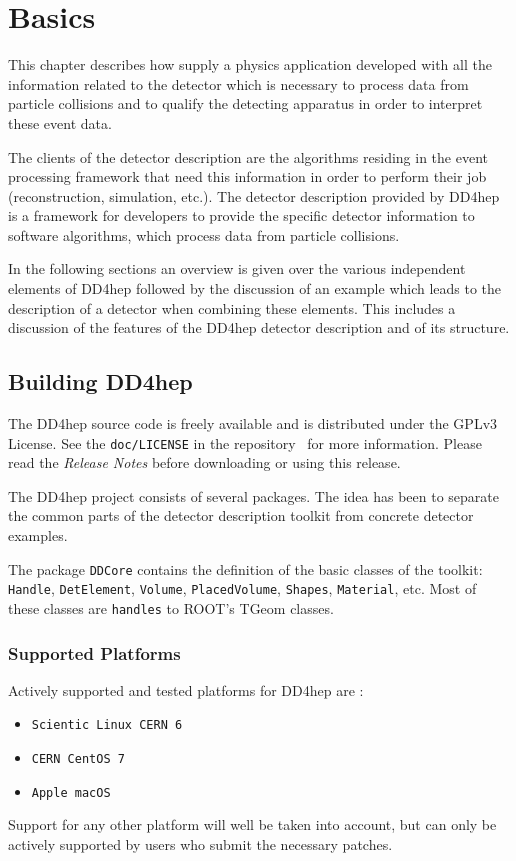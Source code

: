 \chapter{Basics}
\label{sec:dd4hep-user-manual}

This chapter describes how supply a physics application developed with all the information related to the detector which is necessary to process data from particle collisions and to qualify the detecting apparatus in order to interpret these event data.

The clients of the detector description are the algorithms residing in the  event processing framework that need this information in order to perform their job (reconstruction, simulation, etc.). The detector description provided by DD4hep is a framework for developers to provide the specific detector information to software algorithms, which process data from particle collisions.

In the following sections an overview is given over the various independent elements of DD4hep followed by the discussion of an example which leads to  the description of a detector when combining these elements. This includes a discussion of the features of the DD4hep detector description and of its structure. 

\section{Building DD4hep}
\label{sec:dd4hep-user-manual-building}

The DD4hep source code is freely available and is distributed under the GPLv3 License. See the \texttt{doc/LICENSE} in the repository~\cite{dd4hep-repo} for more information. Please read the \textit{Release Notes} before downloading or using this release.

The DD4hep project consists of several packages. The idea  has been to separate the common parts of  the detector description toolkit from concrete detector examples. 

The package {\texttt{DDCore}} contains the definition of the basic classes of the toolkit: \texttt{Handle}, \texttt{DetElement}, \texttt{Volume}, \texttt{PlacedVolume}, \texttt{Shapes}, \texttt{Material}, etc. Most of these classes are \texttt{handles} to ROOT's TGeom classes.

\subsection{Supported Platforms}
\label{sec:dd4hep-user-manual-platforms}
Actively supported and tested platforms for DD4hep are :
\begin{itemize}
\item \texttt{Scientic Linux CERN 6}
\item \texttt{CERN CentOS 7}
\item \texttt{Apple macOS}
\end{itemize}
Support for any other platform will well be taken into account, but can only be actively supported by users who submit the necessary patches.

